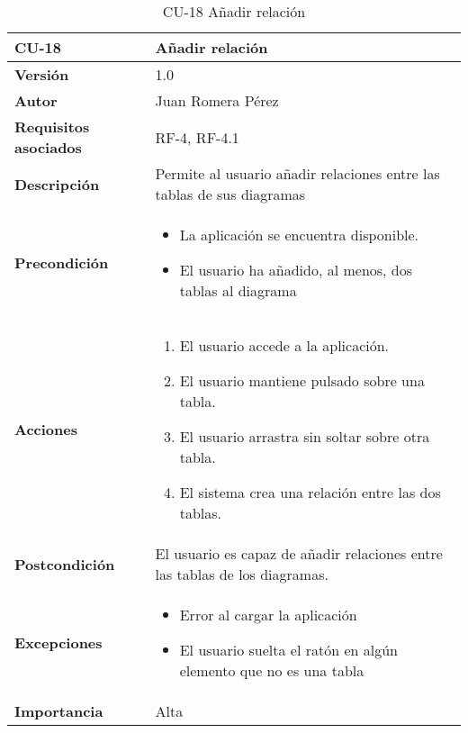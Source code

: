 \begin{table}[p]
    \centering
    \begin{tabularx}{\linewidth}{ p{} p{}}
		\toprule
		\textbf{CU-18}    & \textbf{Añadir relación}\\
		\toprule
		\textbf{Versión}              & 1.0    \\
		\textbf{Autor}                & Juan Romera Pérez \\
		\textbf{Requisitos asociados} & RF-4, RF-4.1 \\
		\textbf{Descripción}          & Permite al usuario añadir relaciones entre las tablas de sus diagramas \\
		\textbf{Precondición}         & \begin{itemize}
		    \item La aplicación se encuentra disponible.
            \item El usuario ha añadido, al menos, dos tablas al diagrama
		\end{itemize} \\
		\textbf{Acciones}             &
		\begin{enumerate}
			\def\labelenumi{\arabic{enumi}.}
			\tightlist
			\item El usuario accede a la aplicación.
            \item El usuario mantiene pulsado sobre una tabla.
            \item El usuario arrastra sin soltar sobre otra tabla.
            \item El sistema crea una relación entre las dos tablas.
		\end{enumerate}\\
		\textbf{Postcondición}        & El usuario es capaz de añadir relaciones entre las tablas de los diagramas. \\
		\textbf{Excepciones}          & \begin{itemize}
		    \item Error al cargar la aplicación
            \item El usuario suelta el ratón en algún elemento que no es una tabla
		\end{itemize} \\
		\textbf{Importancia}          & Alta \\
		\bottomrule
    \end{tabularx}
    \caption{CU-18 Añadir relación}
\end{table}

